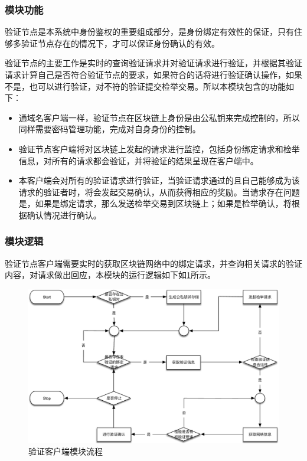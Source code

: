 \subsubsection{模块功能}

验证节点是本系统中身份鉴权的重要组成部分，是身份绑定有效性的保证，只有住够多验证节点存在的情况下，才可以保证身份确认的有效。

验证节点的主要工作是实时的查询验证请求并对验证请求进行验证，并根据其验证请求计算自己是否符合验证节点的要求，如果符合的话将进行验证确认操作，如果不是，也可以进行验证，对不符的验证提交检举交易。所以本模块包含的功能如下：

\begin{itemize}
	\item 
	\noindent{}

	通域名客户端一样，验证节点在区块链上身份是由公私钥来完成控制的，所以同样需要密码管理功能，完成对自身身份的控制。

	\item 
	\noindent{}
	验证节点客户端将对区块链上发起的请求进行监控，包括身份绑定请求和检举信息，对所有的请求都会验证，并将验证的结果呈现在客户端中。

	\item
	\noindent{}

	本客户端会对所有的验证请求进行验证，当验证请求通过的且自己能够成为该请求的验证者时，将会发起交易确认，从而获得相应的奖励。当请求存在问题是，如果是绑定请求，那么发送检举交易到区块链上；如果是检举确认，将根据确认情况进行确认。
	

\end{itemize}

\subsubsection{模块逻辑}

验证节点客户端需要实时的获取区块链网络中的绑定请求，并查询相关请求的验证内容，对请求做出回应，本模块的运行逻辑如下如\ref{fig:validator_work_flow}所示。


\begin{figure}[htbp]
 	\centering
 	\includegraphics[scale=0.6]{img/validator_work_flow}
 	\caption{验证客户端模块流程}\label{fig:validator_work_flow}
\end{figure}


